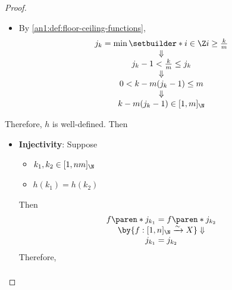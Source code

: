 \begin{proof}
\begin{itemize}
\begin{itemize}
\[\begin{array}{c}
                      1 \leq \ceil*{\frac{k}{m}} \leq n \\
                      \Downarrow                        \\
                      j_{k} \in [1, n]_{\N}
                    \end{array}
                  \]
            \item By \cref{an1:def:floor-ceiling-functions},
                  \[
                    \begin{array}{c}
                      j_{k} = \min\setbuilder*{i \in \Z}{i \geq \frac{k}{m}} \\
                      \Downarrow                                             \\
                      j_{k} - 1 < \frac{k}{m} \leq j_{k}                     \\
                      \Downarrow                                             \\
                      0 < k - m(j_{k} - 1) \leq m                            \\
                      \Downarrow                                             \\
                      k - m(j_{k} - 1) \in [1, m]_{\N}
                    \end{array}
                  \]
          \end{itemize}
          Therefore, $h$ is well-defined. Then
          \begin{itemize}
            \item \textbf{Injectivity}: Suppose
                  \begin{itemize}
                    \item $k_{1}, k_{2} \in [1, nm]_{\N}$
                    \item $h(k_{1}) = h(k_{2})$
                  \end{itemize}
                  Then
                  \[
                    \begin{array}{c}
                      f\paren*{j_{k_{1}}} = f\paren*{j_{k_{2}}}                        \\
                      \by{\ensuremath{f: [1, n]_{\N} \xrightarrow{\sim} X}} \Downarrow \\
                      j_{k_{1}} = j_{k_{2}}
                    \end{array}
                  \]
                  Therefore,
                  \[
                    \begin{array}{c}

\end{array}\]
\end{itemize}
\end{itemize}
\end{proof}
